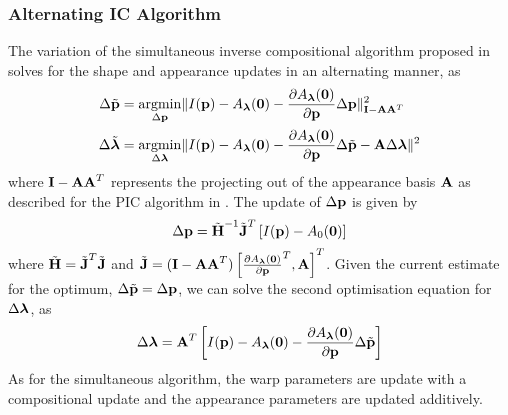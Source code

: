 \subsubsection{Alternating IC Algorithm}\label{subsec:aam-alternating}
The variation of the simultaneous inverse compositional algorithm proposed in
\cite{matthews2004active} solves for the shape and appearance updates in an
alternating manner, as
\begin{equation}
    \begin{aligned}\label{eq:aam-alternating}
        \Delta \tilde{\p} &=       \argmin_{\Delta \p}       \norm{I(\p) - A_{\blambda}(\zero) - \frac{\partial A_{\blambda}(\zero)}{\partial \p} \Delta \p}^2_{\bb{I} - \bb{A} \bb{A}^T} \\
        \Delta \tilde{\blambda} &= \argmin_{\Delta \blambda} \norm{I(\p) - A_{\blambda}(\zero) - \frac{\partial A_{\blambda}(\zero)}{\partial \p} \Delta \tilde{\p} - \bb{A} \Delta \blambda}^2
    \end{aligned}
\end{equation}
where $\boldsymbol{\mathbf{I}} - \boldsymbol{\mathbf{A}} \boldsymbol{\mathbf{A}}^T$ represents the
projecting out of the appearance basis $\boldsymbol{\mathbf{A}}$ as described for the PIC
algorithm in \cite{RefWorks:227}. The update of $\Delta \boldsymbol{\mathbf{p}}$ is given by
\begin{equation}\label{eq:aam-alternating-deltap-update}
        \Delta \boldsymbol{\mathbf{p}} = {\tilde{\boldsymbol{\mathbf{H}}}}^{-1} {\tilde{\boldsymbol{\mathbf{J}}}}^{T} \left[ I(\boldsymbol{\mathbf{p}}) - A_0(\boldsymbol{\mathbf{0}}) \right]
\end{equation}
where ${\tilde{\boldsymbol{\mathbf{H}}}} = {\tilde{\boldsymbol{\mathbf{J}}}}^{T}
\tilde{\boldsymbol{\mathbf{J}}}$ and $\tilde{\boldsymbol{\mathbf{J}}} = (\boldsymbol{\mathbf{I}} -
\boldsymbol{\mathbf{A}} \boldsymbol{\mathbf{A}}^T) \left[ {\frac{\partial
A_{\boldsymbol{\mathbf{\lambda}}}(\boldsymbol{\mathbf{0}})}{\partial \boldsymbol{\mathbf{p}}}}^T, \boldsymbol{\mathbf{A}} \right]^T$. Given the
current estimate for the optimum, $\Delta \tilde{\boldsymbol{\mathbf{p}}} = \Delta \boldsymbol{\mathbf{p}}$, we can solve
the second optimisation equation for $\Delta \boldsymbol{\mathbf{\lambda}}$, as
\begin{equation}\label{eq:aam-alternating-deltalambda-update}
        \Delta \boldsymbol{\mathbf{\lambda}} = \boldsymbol{\mathbf{A}}^T \left[ I(\boldsymbol{\mathbf{p}}) - A_{\boldsymbol{\mathbf{\lambda}}}(\boldsymbol{\mathbf{0}}) - \frac{\partial A_{\boldsymbol{\mathbf{\lambda}}}(\boldsymbol{\mathbf{0}})}{\partial \boldsymbol{\mathbf{p}}} \Delta \tilde{\boldsymbol{\mathbf{p}}} \right]
\end{equation}
As for the simultaneous algorithm, the warp parameters are update with a
compositional update and the appearance parameters are updated additively.

